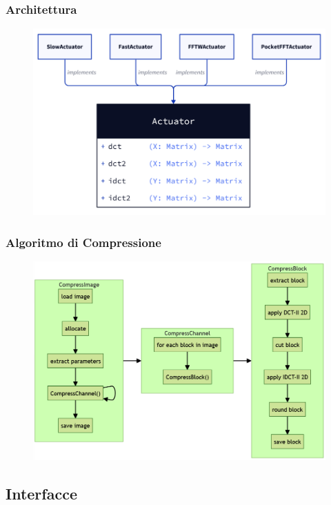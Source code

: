 \documentclass{beamer}
\begin{document}
\begin{frame}
\frametitle{Architettura}
\begin{figure}
  \centering
  \includegraphics[width=\linewidth]{images/diagram.png}
\end{figure}
\end{frame}

\begin{frame}
\frametitle{Algoritmo di Compressione}
\begin{figure}
  \centering
  \includegraphics[width=\linewidth]{images/ad-compression.png}
\end{figure}
\end{frame}

\subsection{Interfacce}
\end{document}
